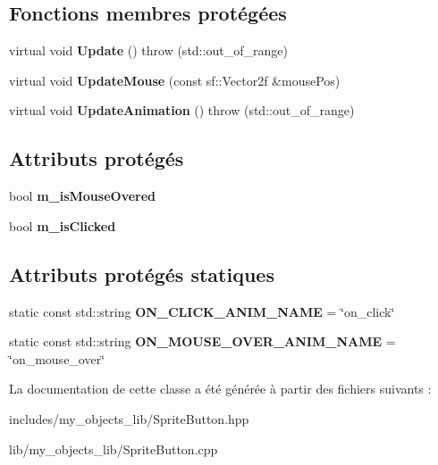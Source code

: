 \subsection*{Fonctions membres protégées}
\begin{DoxyCompactItemize}
\item 
\mbox{\label{classmy_1_1SpriteButton_ae2f9b647749c3380a38fff6341117a1a}} 
virtual void {\bfseries Update} ()  throw (std\+::out\+\_\+of\+\_\+range)
\item 
\mbox{\label{classmy_1_1SpriteButton_a997274cd61466d69104e37f274485ab4}} 
virtual void {\bfseries Update\+Mouse} (const sf\+::\+Vector2f \&mouse\+Pos)
\item 
\mbox{\label{classmy_1_1SpriteButton_acd9b680033cd93cb7ce3cb01935edc87}} 
virtual void {\bfseries Update\+Animation} ()  throw (std\+::out\+\_\+of\+\_\+range)
\end{DoxyCompactItemize}
\subsection*{Attributs protégés}
\begin{DoxyCompactItemize}
\item 
\mbox{\label{classmy_1_1SpriteButton_a0972a48b66dab6e0949863d177b86f99}} 
bool {\bfseries m\+\_\+is\+Mouse\+Overed}
\item 
\mbox{\label{classmy_1_1SpriteButton_a56929961aa06e613d74ff2c70ad1f1b5}} 
bool {\bfseries m\+\_\+is\+Clicked}
\end{DoxyCompactItemize}
\subsection*{Attributs protégés statiques}
\begin{DoxyCompactItemize}
\item 
\mbox{\label{classmy_1_1SpriteButton_a71bf74337f795f1b5755b767c19b164b}} 
static const std\+::string {\bfseries O\+N\+\_\+\+C\+L\+I\+C\+K\+\_\+\+A\+N\+I\+M\+\_\+\+N\+A\+ME} = \char`\"{}on\+\_\+click\char`\"{}
\item 
\mbox{\label{classmy_1_1SpriteButton_a2a6d4d8c6943d38854dfb59410ef8a7f}} 
static const std\+::string {\bfseries O\+N\+\_\+\+M\+O\+U\+S\+E\+\_\+\+O\+V\+E\+R\+\_\+\+A\+N\+I\+M\+\_\+\+N\+A\+ME} = \char`\"{}on\+\_\+mouse\+\_\+over\char`\"{}
\end{DoxyCompactItemize}


La documentation de cette classe a été générée à partir des fichiers suivants \+:\begin{DoxyCompactItemize}
\item 
includes/my\+\_\+objects\+\_\+lib/Sprite\+Button.\+hpp\item 
lib/my\+\_\+objects\+\_\+lib/Sprite\+Button.\+cpp\end{DoxyCompactItemize}
